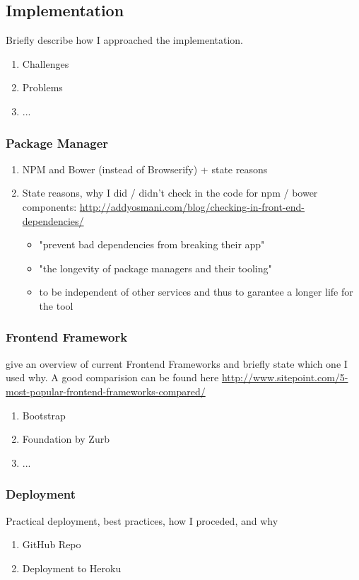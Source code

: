 \subsection{Implementation}
\label{4d_implementation}


Briefly describe how I approached the implementation.

\begin{enumerate}
\item Challenges
\item Problems
\item ...
\end{enumerate}


\subsubsection{Package Manager}

\begin{enumerate}
\item NPM and Bower (instead of Browserify) + state reasons
\item State reasons, why I did / didn't check in the code for npm / bower components: \url{http://addyosmani.com/blog/checking-in-front-end-dependencies/}

    \begin{itemize}
    \item "prevent bad dependencies from breaking their app"
    \item "the longevity of package managers and their tooling"
    \item to be independent of other services and thus to garantee a longer life for the tool
    \end{itemize}
\end{enumerate}



\subsubsection{Frontend Framework}

give an overview of current Frontend Frameworks and briefly state which one I used why. A good comparision can be found here \url{http://www.sitepoint.com/5-most-popular-frontend-frameworks-compared/}

\begin{enumerate}
\item Bootstrap
\item Foundation by Zurb
\item ...
\end{enumerate}



\subsubsection{Deployment}

Practical deployment, best practices, how I proceded, and why

\begin{enumerate}
\item GitHub Repo
\item Deployment to Heroku
\end{enumerate}